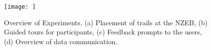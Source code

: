 \begin{figure}
\begin{center}
\texttt{[image: ]}
\caption{Overview of Experiments. (a) Placement of trails at the NZEB, (b) Guided tours for participants, (c) Feedback prompts to the users, (d) Overview of data communication.}
\label{fig:experiments}
\end{center}
\end{figure}





